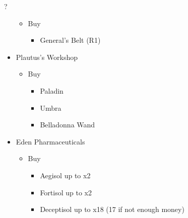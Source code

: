 \begin{shop}{?}
\begin{itemize}
			\begin{itemize}
				\item Buy
					\begin{itemize}
						\item General's Belt (R1)
					\end{itemize}
			\end{itemize}
		\item Plautus's Workshop
			\begin{itemize}
				\item Buy
					\begin{itemize}
						\item Paladin
						\item Umbra
						\item Belladonna Wand
					\end{itemize}
			\end{itemize}	
		\item Eden Pharmaceuticals
			\begin{itemize}
				\item Buy
					\begin{itemize}
						\item Aegisol up to x2
						\item Fortisol up to x2
						\item Deceptisol up to x18 (17 if not enough money)
					\end{itemize}
			\end{itemize}											
	\end{itemize}
\end{shop}

